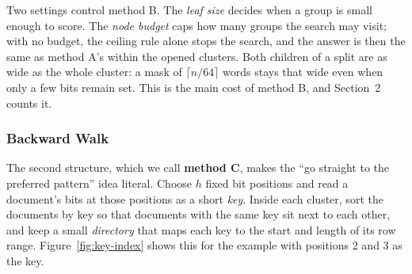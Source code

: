 Two settings control method B. The \emph{leaf size} decides when a group is small enough to
score. The \emph{node budget} caps how many groups the search may visit; with no budget, the
ceiling rule alone stops the search, and the answer is then the same as method A's within the
opened clusters. Both children of a split are as wide as the whole cluster: a mask of
$\lceil n/64\rceil$ words stays that wide even when only a few bits remain set. This is the
main cost of method B, and Section~2 counts it.

\subsubsection{Backward Walk}
The second structure, which we call \textbf{method C}, makes the ``go straight to the
preferred pattern'' idea literal. Choose $h$ fixed bit positions and read a document's bits
at those positions as a short \emph{key}. Inside each cluster, sort the documents by key so
that documents with the same key sit next to each other, and keep a small \emph{directory}
that maps each key to the start and length of its row range. Figure~\ref{fig:key-index}
shows this for the example with positions 2 and 3 as the key.

